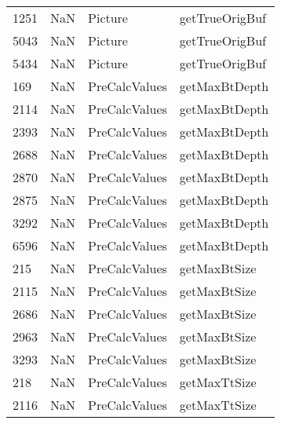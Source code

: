 \begin{tabular}{llll}
1251 &                   NaN &                    Picture &                            getTrueOrigBuf \\
5043 &                   NaN &                    Picture &                            getTrueOrigBuf \\
5434 &                   NaN &                    Picture &                            getTrueOrigBuf \\
169  &                   NaN &              PreCalcValues &                             getMaxBtDepth \\
2114 &                   NaN &              PreCalcValues &                             getMaxBtDepth \\
2393 &                   NaN &              PreCalcValues &                             getMaxBtDepth \\
2688 &                   NaN &              PreCalcValues &                             getMaxBtDepth \\
2870 &                   NaN &              PreCalcValues &                             getMaxBtDepth \\
2875 &                   NaN &              PreCalcValues &                             getMaxBtDepth \\
3292 &                   NaN &              PreCalcValues &                             getMaxBtDepth \\
6596 &                   NaN &              PreCalcValues &                             getMaxBtDepth \\
215  &                   NaN &              PreCalcValues &                              getMaxBtSize \\
2115 &                   NaN &              PreCalcValues &                              getMaxBtSize \\
2686 &                   NaN &              PreCalcValues &                              getMaxBtSize \\
2963 &                   NaN &              PreCalcValues &                              getMaxBtSize \\
3293 &                   NaN &              PreCalcValues &                              getMaxBtSize \\
218  &                   NaN &              PreCalcValues &                              getMaxTtSize \\
2116 &                   NaN &              PreCalcValues &                              getMaxTtSize \\

\end{tabular}
